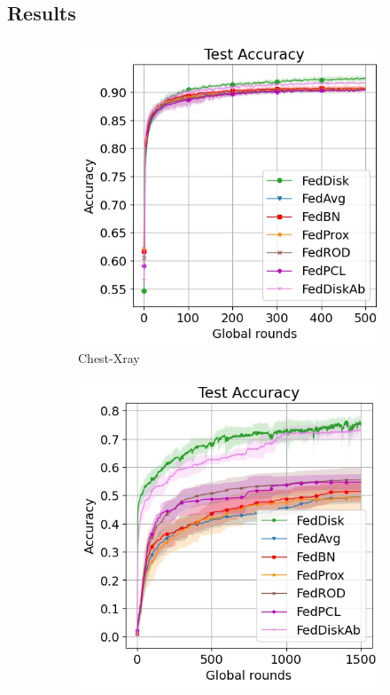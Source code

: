 \documentclass[journal]{IEEEtai}
\begin{document}
\subsection{Results}
\begin{figure}[ht!]
	\centering
	\begin{subfigure}[t]{0.3\linewidth}	
		\includegraphics[width=\linewidth]{Figures/xray/test_acc}
		\caption{Chest-Xray }
		\label{fig:acc_xray}
	\end{subfigure}
	\hspace{0.01em}%
	\begin{subfigure}[t]{0.3\linewidth}
		\includegraphics[width=\linewidth]{Figures/femnist/test_acc}

\end{subfigure}
\end{figure}
\end{document}
